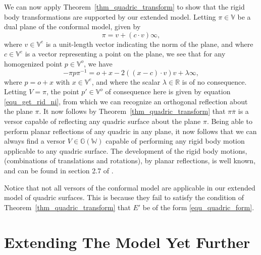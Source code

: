 \documentclass{birkjour}
\theoremstyle{definition}
\theoremstyle{remark}
\numberwithin{equation}{section}
\newcommand{\G}{\mathbb{G}}
\newcommand{\V}{\mathbb{V}}
\newcommand{\W}{\mathbb{W}}
\newcommand{\R}{\mathbb{R}}
\newcommand{\nvao}{o}
\newcommand{\nvai}{\infty}
\begin{document}
We can now apply Theorem~\ref{thm_quadric_transform} to show
that the rigid body transformations are supported by our extended model.
Letting $\pi\in\V$ be a dual plane of the conformal model, given by
\begin{equation}
\pi = v+(c\cdot v)\nvai,
\end{equation}
where $v\in\V^e$ is a unit-length vector indicating the norm of the plane,
and where $c\in\V^e$ is a vector representing a point on the plane,
we see that for any homogenized point $p\in\V^o$, we have
\begin{equation}
-\pi p\pi^{-1} = \nvao+x-2((x-c)\cdot v)v + \lambda\nvai,
\end{equation}
where $p=\nvao+x$ with $x\in\V^e$, and
where the scalar $\lambda\in\R$ is of no consequence.  Letting $V=\pi$,
the point $p'\in\V^o$ of consequence here is given by equation \eqref{equ_get_rid_ni},
from which we can recognize an orthogonal reflection about the plane $\pi$.
It now follows by Theorem~\ref{thm_quadric_transform} that $\pi\overline{\pi}$ is a versor
capable of reflecting any quadric surface about the plane $\pi$.
Being able to perform planar reflections of any quadric in any plane, it
now follows that we can always find a versor $V\in\G(\W)$ capable of performing
any rigid body motion applicable to any quadric surface.  The development
of the rigid body motions, (combinations of translations and rotations), by planar reflections,
is well known, and can be found in section 2.7 of \cite{LiRockwood}.

Notice that not all versors of the conformal model are applicable in
our extended model of quadric surfaces.  This is because they fail to
satisfy the condition of Theorem~\ref{thm_quadric_transform} that $E'$ be
of the form \eqref{equ_quadric_form}.

\section{Extending The Model Yet Further}
\end{document}
